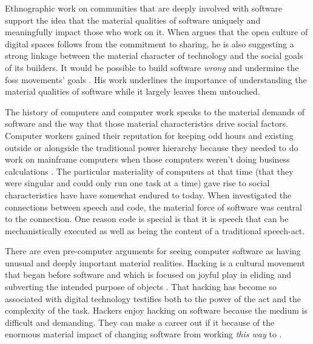 \documentclass[a4paper,man,natbib,floatsintext]{apa6}
\begin{document}
  Ethnographic work on communities that are deeply involved with software support the idea that the material qualities of software uniquely and meaningfully impact those who work on it. When \citet{Kelty2008-jm} argues that the open culture of digital spaces follows from the commitment to sharing, he is also suggesting a strong linkage between the material character of technology and the social goals of its builders. It would be possible to build software \textit{wrong} and undermine the \gls{foss} movements' goals \citep{Kelty2008-jm}. His work underlines the importance of understanding the material qualities of software while it largely leaves them untouched.

  The history of computers and computer work speaks to the material demands of software and the way that those material characteristics drive social factors. Computer workers gained their reputation for keeping odd hours and existing outside or alongside the traditional power hierarchy because they needed to do work on mainframe computers when those computers weren't doing business calculations \citep{Ensmenger2012-kz}. The particular materiality of computers at that time (that they were singular and could only run one task at a time) gave rise to social characteristics have have somewhat endured to today. When \citet{Cox2013-zo} investigated the connections between speech and code, the material force of software was central to the connection. One reason code is special is that it is speech that can be mechanistically executed as well as being the content of a traditional speech-act. 

  There are even pre-computer arguments for seeing computer software as having unusual and deeply important material realities. Hacking is a cultural movement that began before software and which is focused on joyful play in eliding and subverting the intended purpose of objects \citep{Drexler2019-ja,Gabriella_Coleman2012-lq}. That hacking has become so associated with digital technology testifies both to the power of the act and the complexity of the task. Hackers enjoy hacking on software because the medium is difficult and demanding. They can make a career out if it because of the enormous material impact of changing software from working \textit{this way} to .
\end{document}
